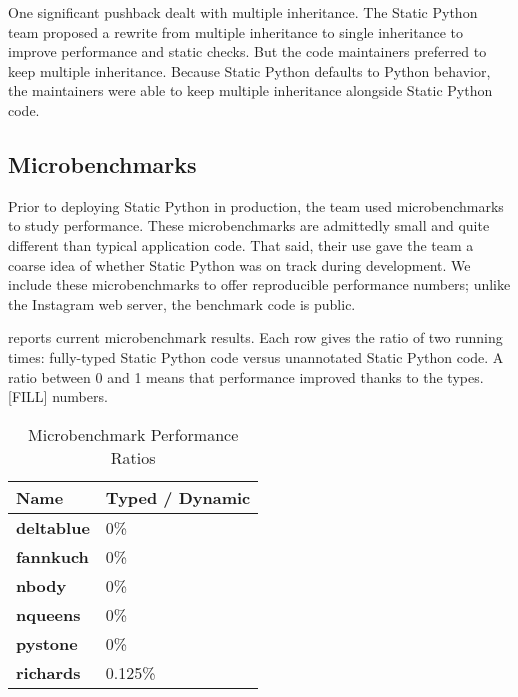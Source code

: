 \documentclass[english,cleveref,submission]{programming}
\newcommand{\SP}{Static Python}
\newcommand{\bmname}[1]{\textbf{#1}}
\begin{document}
One significant pushback dealt with multiple inheritance.
The \SP{} team proposed a rewrite from multiple inheritance to single inheritance
to improve performance and static checks.
But the code maintainers preferred to keep multiple inheritance.
Because \SP{} defaults to Python behavior, the maintainers were able
to keep multiple inheritance alongside \SP{} code.



\subsection{Microbenchmarks}




Prior to deploying \SP{} in production, the team used microbenchmarks to study performance.
These microbenchmarks are admittedly small and quite different than typical application code.
That said, their use gave the team a coarse idea of whether \SP{} was on track during development.
We include these microbenchmarks to offer reproducible performance numbers;
unlike the Instagram web server, the benchmark code is public.

 reports current microbenchmark results.
Each row gives the ratio of two running times: fully-typed \SP{} code versus
unannotated \SP{} code.
A ratio between 0 and 1 means that performance improved thanks to the types.
[FILL] numbers.

\begin{table}[t]
  \caption{Microbenchmark Performance Ratios}
  \label{t:microbenchmark}
  \begin{tabular}{ll}
    Name               & Typed / Dynamic \\\midrule
    \bmname{deltablue} &             0\% \\
    \bmname{fannkuch}  &             0\% \\
    \bmname{nbody}     &             0\% \\
    \bmname{nqueens}   &             0\% \\
    \bmname{pystone}   &             0\% \\
    \bmname{richards}  &         0.125\% \\
  \end{tabular}
\end{table}
\end{document}
